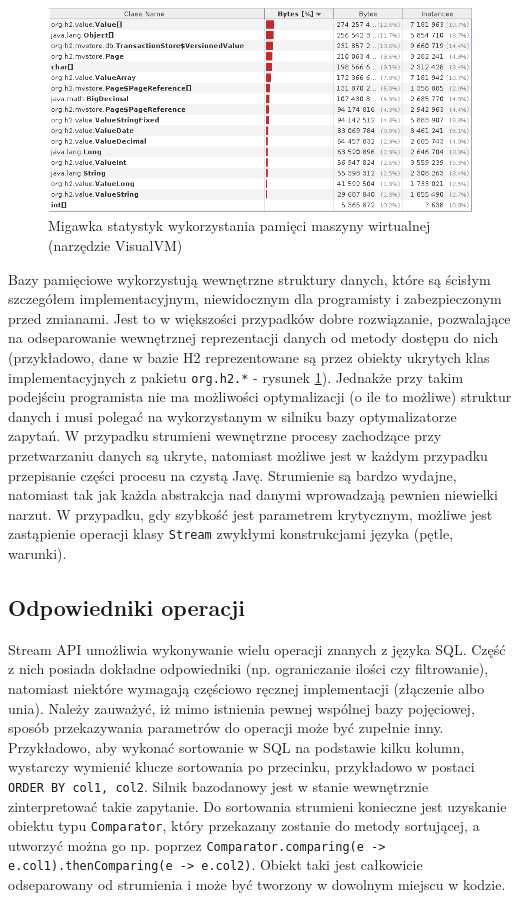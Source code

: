 \documentclass[12pt,twoside,openright]{extarticle}
\begin{document}
\begin{figure}[h]
\centering
\includegraphics[width=15cm]{jvmmemory}
\caption{Migawka statystyk wykorzystania pamięci maszyny wirtualnej (narzędzie VisualVM)}
\label{fig:jvmmemory}
\end{figure}

    Bazy pamięciowe wykorzystują wewnętrzne struktury danych, które są ścisłym szczegółem implementacyjnym, niewidocznym dla programisty i zabezpieczonym przed zmianami. Jest to w większości przypadków dobre rozwiązanie, pozwalające na odseparowanie wewnętrznej reprezentacji danych od metody dostępu do nich (przykładowo, dane w bazie H2 reprezentowane są przez obiekty ukrytych klas implementacyjnych z pakietu \texttt{org.h2.*} - rysunek \ref{fig:jvmmemory}). Jednakże przy takim podejściu programista nie ma możliwości optymalizacji (o ile to możliwe) struktur danych i musi polegać na wykorzystanym w silniku bazy optymalizatorze zapytań. W przypadku strumieni wewnętrzne procesy zachodzące przy przetwarzaniu danych są ukryte, natomiast możliwe jest w każdym przypadku przepisanie części procesu na czystą Javę. Strumienie są bardzo wydajne, natomiast tak jak każda abstrakcja nad danymi wprowadzają pewnien niewielki narzut. W przypadku, gdy szybkość jest parametrem krytycznym, możliwe jest zastąpienie operacji klasy \texttt{Stream} zwykłymi konstrukcjami języka (pętle, warunki). 


    \subsection{Odpowiedniki operacji}

    Stream API umożliwia wykonywanie wielu operacji znanych z języka SQL. Część z nich posiada dokładne odpowiedniki (np. ograniczanie ilości czy filtrowanie), natomiast niektóre wymagają częściowo ręcznej implementacji (złączenie albo unia). Należy zauważyć, iż mimo istnienia pewnej wspólnej bazy pojęciowej, sposób przekazywania parametrów do operacji może być zupełnie inny. Przykładowo, aby wykonać sortowanie w SQL na podstawie kilku kolumn, wystarczy wymienić klucze sortowania po przecinku, przykładowo w postaci \texttt{ORDER BY col1, col2}. Silnik bazodanowy jest w stanie wewnętrznie zinterpretować takie zapytanie. Do sortowania strumieni konieczne jest uzyskanie obiektu typu \texttt{Comparator}, który przekazany zostanie do metody sortującej, a utworzyć można go np. poprzez \texttt{Comparator.comparing(e -> e.col1).thenComparing(e -> e.col2)}. Obiekt taki jest całkowicie odseparowany od strumienia i może być tworzony w dowolnym miejscu w kodzie.
\end{document}
